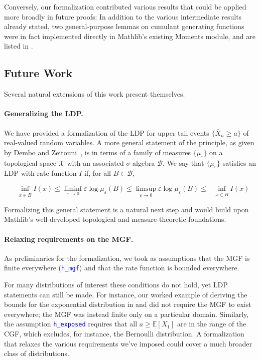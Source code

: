 \documentclass{article}
\newcommand{\leancode}[1]{\textcolor{blue}{\nolinkurl{#1}}}
\newcommand{\E}{\mathbb{E}}
\begin{document}
Conversely, our formalization contributed various results that could be applied more broadly in
future proofs:
In addition to the various intermediate results already stated, two general-purpose
lemmas on cumulant generating functions were in fact implemented directly in Mathlib's existing
Moments module, and are listed in .

\subsection{Future Work}

Several natural extensions of this work present themselves.

\paragraph{Generalizing the LDP.}
We have provided a formalization of the LDP for upper tail events $\{\overline{X}_n \ge a\}$ of
real-valued random variables. A more general statement of the principle, as given by Dembo and
Zeitouni~\cite{dembo1998large}, is in terms of a family of measures $\{\mu_\varepsilon\}$ on
a topological space $\mathcal{X}$ with an associated $\sigma$-algebra $\mathcal{B}$. We say that $\{\mu_\varepsilon\}$ satisfies an LDP with rate function $I$ if, for all $B \in \mathcal{B}$,

\begin{equation}
  -\inf_{x\in \mathring{B}} I(x)
  \le \liminf_{\varepsilon\to 0} \varepsilon \log \mu_\varepsilon(B)
  \le \limsup_{\varepsilon\to 0} \varepsilon \log \mu_\varepsilon(B)
  \le -\inf_{x\in \overline{B}} I(x)
\end{equation}

Formalizing this general statement is a natural next step and would build upon Mathlib's well-developed
topological and measure-theoretic foundations.

\paragraph{Relaxing requirements on the MGF.}
As preliminaries for the formalization, we took as assumptions that the MGF is finite everywhere
(\leancode{h\_mgf}) and that the rate function is bounded everywhere.

For many distributions of interest these conditions do not hold, yet LDP statements can still be made. For instance, our worked example of deriving the bounds for the exponential
distribution in  and  did not require
the MGF to exist everywhere; the MGF was instead finite only on a particular domain.
Similarly, the assumption \leancode{h\_exposed} requires that all $a \ge \E[X_1]$ are in the range
of the CGF, which excludes, for instance, the Bernoulli distribution.
A formalization that relaxes the various requirements we've imposed could cover a much broader
class of distributions.
\end{document}
